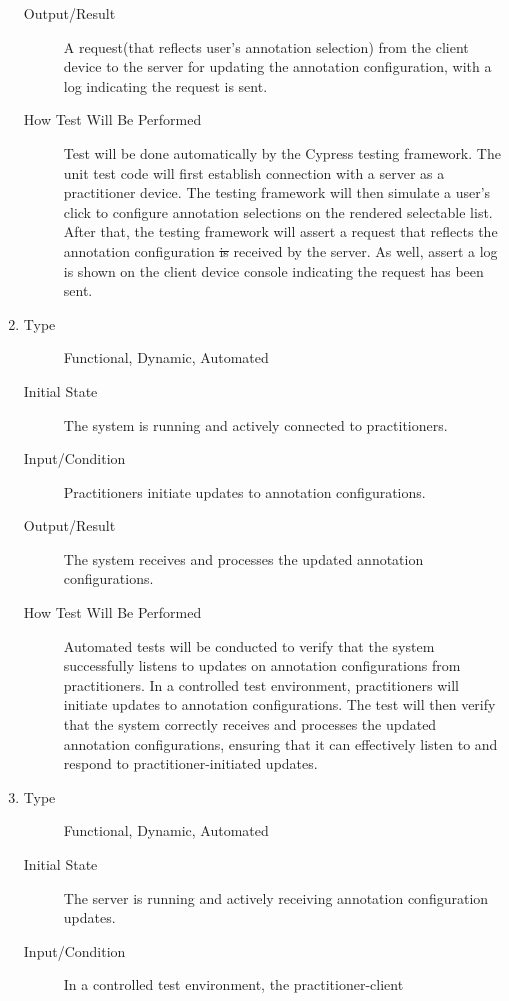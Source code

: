 \documentclass[12pt, titlepage]{article}
\begin{document}
\begin{enumerate}[FR-T1]
\begin{description}
  \item[Output/Result] A request(that reflects user’s annotation selection) from
    the client device to the server for updating the annotation configuration,
    with a log indicating the request is sent.
  \item[How Test Will Be Performed] Test will be done automatically by the
    Cypress testing framework. The unit test code will first establish connection
    with a server as a practitioner device. The testing framework will then
    simulate a user's click to configure annotation selections on the rendered
    selectable list. After that, the testing framework will assert a request
    that reflects the annotation configuration \sout{is} received by the server. As
    well, assert a log is shown on the client device console indicating the
    request has been sent.
  \end{description}
\item \label{FRT6}
  \begin{description}
  \item[Type] Functional, Dynamic, Automated
  \item[Initial State] The system is running and actively connected to
    practitioners.
  \item[Input/Condition] Practitioners initiate updates to annotation
    configurations.
  \item[Output/Result] The system receives and processes the updated annotation
    configurations.
  \item[How Test Will Be Performed] Automated tests will be conducted to verify
    that the system successfully listens to updates on annotation configurations
    from practitioners. In a controlled test environment, practitioners will
    initiate updates to annotation configurations. The test will then verify
    that the system correctly receives and processes the updated annotation
    configurations, ensuring that it can effectively listen to and respond to
    practitioner-initiated updates.
  \end{description}
\item \label{FRT7}
  \begin{description}
  \item[Type] Functional, Dynamic, Automated
  \item[Initial State] The server is running and actively receiving annotation
    configuration updates.
  \item[Input/Condition] In a controlled test environment, the practitioner-client

\end{description}
\end{enumerate}
\end{document}
